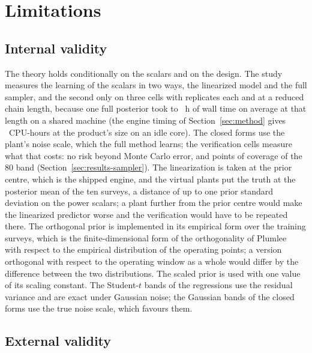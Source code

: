 \section{Limitations}\label{sec:limitations}

\subsection{Internal validity}

The theory holds conditionally on the scalars and on the design. The study measures the learning of the scalars in two ways,
the linearized model and the full sampler, and the second only on three cells with \verReps{} replicates each and at a reduced
chain length, because one full posterior took \sbcWallHours{} to \verWallHours~h of wall time on average at that length on a
shared machine (the engine timing of Section~\ref{sec:method} gives \cbCpuHours~CPU-hours at the product's size on an idle
core). The closed forms use the plant's noise scale, which the full method learns; the verification cells measure what
that costs: no risk beyond Monte Carlo error, and \verCovGap{} points of coverage of the 80\pct{} band (Section~\ref{sec:results-sampler}). The linearization is taken at the prior centre, which is the
shipped engine, and the virtual plants put the truth at the posterior mean of the ten surveys, a distance of up to one prior
standard deviation on the power scalars; a plant further from the prior centre would make the linearized predictor worse and
the verification would have to be repeated there. The orthogonal prior is implemented in its empirical form over the training
surveys, which is the finite-dimensional form of the orthogonality of Plumlee~\cite{plumlee} with respect to the empirical
distribution of the operating points; a version orthogonal with respect to the operating window as a whole would differ by
the difference between the two distributions. The scaled prior is used with one value of its scaling constant. The Student-$t$
bands of the regressions use the residual variance and are exact under Gaussian noise; the Gaussian bands of the closed forms
use the true noise scale, which favours them.

\subsection{External validity}

